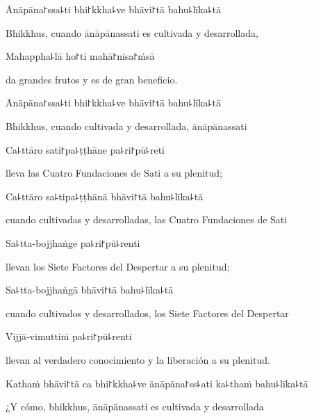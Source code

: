 Ānāpāna꜓ssa꜕ti bhi꜓kkha꜕ve bhāvi꜓tā bahu꜕līka꜕tā

\begin{english}
  Bhikkhus, cuando ānāpānassati es cultivada y desarrollada,
\end{english}

Mahappha꜕lā ho꜓ti mahā꜓nisa꜓ṁsā

\begin{english}
  da grandes frutos y es de gran beneficio.
\end{english}

Ānāpāna꜓ssa꜕ti bhi꜓kkha꜕ve bhāvi꜓tā bahu꜕līka꜕tā

\begin{english}
  Bhikkhus, cuando cultivada y desarrollada, ānāpānassati
\end{english}

Ca꜕ttāro sati꜓pa꜕ṭṭhāne pa꜕ri꜓pū꜕reti

\begin{english}
  lleva las Cuatro Fundaciones de Sati a su plenitud;
\end{english}

Ca꜕ttāro sa꜕tipa꜕ṭṭhānā bhāvi꜓tā bahu꜕līka꜕tā

\begin{english}
  cuando cultivadas y desarrolladas, las Cuatro Fundaciones de Sati
\end{english}

Sa꜕tta-bojjhaṅge pa꜕ri꜓pū꜕renti

\begin{english}
  llevan los Siete Factores del Despertar a su plenitud;
\end{english}

Sa꜕tta-bojjhaṅgā bhāvi꜓tā bahu꜕līka꜕tā

\begin{english}
  cuando cultivados y desarrollados, los Siete Factores del Despertar
\end{english}

\enlargethispage{\baselineskip}

Vijjā-vimuttiṁ pa꜕ri꜓pū꜕renti

\begin{english}
  llevan al verdadero conocimiento y la liberación a su plenitud.
\end{english}

Kathaṁ bhāvi꜓tā ca bhi꜓kkha꜕ve ānāpāna꜓ss꜕ati ka꜕thaṁ bahu꜕līka꜕tā

\begin{english}
  ¿Y cómo, bhikkhus, ānāpānassati es cultivada y desarrollada
\end{english}

